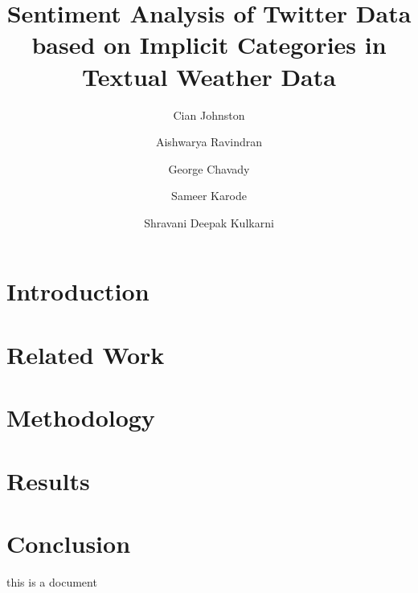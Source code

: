 \documentclass[manuscript]{clv3}
\title{Sentiment Analysis of Twitter Data based on Implicit Categories in Textual Weather Data}
\author{Cian Johnston}
\author{Aishwarya Ravindran}
\author{George Chavady}
\author{Sameer Karode}
\author{Shravani Deepak Kulkarni}
\begin{document}
\maketitle
\section{Introduction}

\section{Related Work}

\section{Methodology}

\section{Results}

\section{Conclusion}
this is a document
\end{document}
